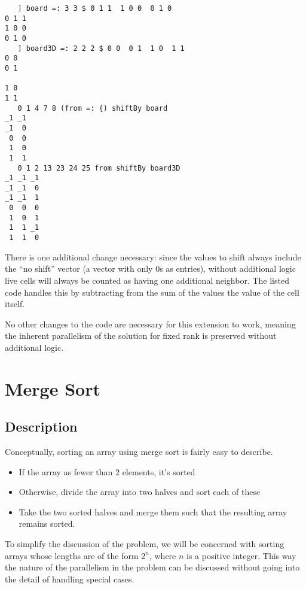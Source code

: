 \begin{singlespacing}
\begin{small}
\begin{verbatim}
   ] board =: 3 3 $ 0 1 1  1 0 0  0 1 0
0 1 1
1 0 0
0 1 0
   ] board3D =: 2 2 2 $ 0 0  0 1  1 0  1 1
0 0
0 1

1 0
1 1
   0 1 4 7 8 (from =: {) shiftBy board
_1 _1
_1  0
 0  0
 1  0
 1  1
   0 1 2 13 23 24 25 from shiftBy board3D
_1 _1 _1
_1 _1  0
_1 _1  1
 0  0  0
 1  0  1
 1  1 _1
 1  1  0
\end{verbatim}
\end{small}
\end{singlespacing}

There is one additional change necessary:
since the values to shift always include the ``no shift'' vector
(a vector with only 0s as entries),
without additional logic live cells will always be counted as 
having one additional neighbor. 
The listed code handles this by subtracting from 
the sum of the values the value of the cell itself.

No other changes to the code are necessary for this extension to work, 
meaning the inherent parallelism of the solution for fixed rank 
is preserved without additional logic.

\section{Merge Sort}
\subsection{Description}
Conceptually, sorting an array using merge sort is fairly easy to describe.

\begin{itemize}
	\item If the array as fewer than 2 elements, it's sorted
	\item Otherwise, divide the array into two halves and sort each of these
	\item Take the two sorted halves and merge them such that the resulting array remains sorted.
\end{itemize}

To simplify the discussion of the problem, 
we will be concerned with sorting arrays 
whose lengths are of the form $2^n$, where $n$ is a positive integer.
This way the nature of the parallelism in the problem can be discussed 
without going into the detail of handling special cases.


